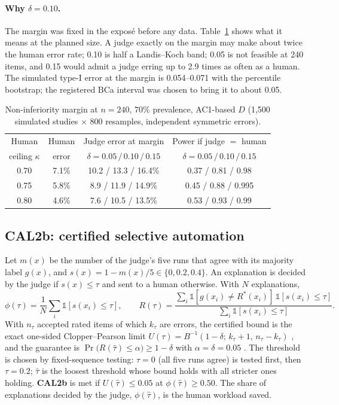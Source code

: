 \paragraph{Why $\delta=0.10$.}\hspace{0.6em}The margin was fixed in the expos\'e before any data. Table~\ref{tab:margin} shows what it means at the planned size. A judge exactly on the margin may make about twice the human error rate; 0.10 is half a Landis--Koch band; 0.05 is not feasible at 240 items, and 0.15 would admit a judge erring up to 2.9 times as often as a human. The simulated type-I error at the margin is 0.054--0.071 with the percentile bootstrap; the registered BCa interval was chosen to bring it to about 0.05.
\begin{table}[H]
\centering
\caption{Non-inferiority margin at $n=240$, 70\% prevalence, AC1-based $D$ (1{,}500 simulated studies $\times$ 800 resamples, independent symmetric errors).}
\label{tab:margin}
\small
\begin{tabular}{@{}cccc@{}}
\toprule
Human & Human & Judge error at margin & Power if judge $=$ human \\
ceiling $\kappa$ & error & $\delta=0.05\,/\,0.10\,/\,0.15$ & $\delta=0.05\,/\,0.10\,/\,0.15$ \\
\midrule
0.70 & 7.1\% & 10.2 / 13.3 / 16.4\% & 0.37 / 0.81 / 0.98 \\
0.75 & 5.8\% & 8.9 / 11.9 / 14.9\% & 0.45 / 0.88 / 0.995 \\
0.80 & 4.6\% & 7.6 / 10.5 / 13.5\% & 0.53 / 0.93 / 0.99 \\
\bottomrule
\end{tabular}
\end{table}

\subsection{CAL2b: certified selective automation}
Let $m(x)$ be the number of the judge's five runs that agree with its majority label $g(x)$, and $s(x)=1-m(x)/5\in\{0,0.2,0.4\}$. An explanation is decided by the judge if $s(x)\le\tau$ and sent to a human otherwise. With $N$ explanations,
\begin{equation}
\phi(\tau)=\frac1N\sum_{i}\mathbb{1}[s(x_i)\le\tau],\qquad
R(\tau)=\frac{\sum_i\mathbb{1}[g(x_i)\neq R^{*}(x_i)]\,\mathbb{1}[s(x_i)\le\tau]}{\sum_i\mathbb{1}[s(x_i)\le\tau]} .
\end{equation}
With $n_\tau$ accepted rated items of which $k_\tau$ are errors, the certified bound is the exact one-sided Clopper--Pearson limit $U(\tau)=B^{-1}(1-\delta;\,k_\tau+1,\,n_\tau-k_\tau)$ \citep{clopper1934}, and the guarantee is $\Pr\bigl(R(\hat\tau)\le\alpha\bigr)\ge1-\delta$ with $\alpha=\delta=0.05$ \citep{geifman,learntest}. The threshold is chosen by fixed-sequence testing: $\tau=0$ (all five runs agree) is tested first, then $\tau=0.2$; $\hat\tau$ is the loosest threshold whose bound holds with all stricter ones holding. \textbf{CAL2b} is met if $U(\hat\tau)\le0.05$ at $\phi(\hat\tau)\ge0.50$. The share of explanations decided by the judge, $\phi(\hat\tau)$, is the human workload saved.

